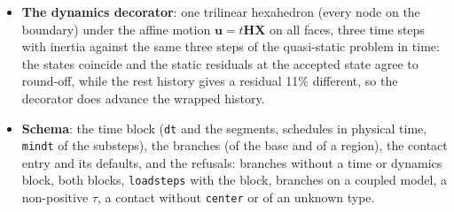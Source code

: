 \documentclass[11pt]{article}
\newcommand{\bX}{\bm{X}}
\newcommand{\bu}{\bm{u}}
\DeclareRobustCommand{\code}[1]{{\def\_{\textunderscore\allowbreak}\texttt{#1}}}
\begin{document}
\begin{itemize}[nosep]
    supported bottom face to $10^{-9}$ (the top centre sinks by 0.100).
  \item \textbf{The dynamics decorator}: one trilinear hexahedron (every
    node on the boundary) under the affine motion $\bu = t\bm H\bX$ on all
    faces, three time steps with inertia against the same three steps of
    the quasi-static problem in time: the states coincide and the static
    residuals at the accepted state agree to round-off, while the rest
    history gives a residual 11\% different, so the decorator does advance
    the wrapped history.
  \item \textbf{Schema}: the time block (\code{dt} and the segments,
    schedules in physical time, \code{min\_dt} of the substeps), the
    branches (of the base and of a region), the contact entry and its
    defaults, and the refusals: branches without a time or dynamics block,
    both blocks, \code{load\_steps} with the block, branches on a coupled
    model, a non-positive $\tau$, a contact without \code{center} or of an
    unknown type.
\end{itemize}
\end{document}

